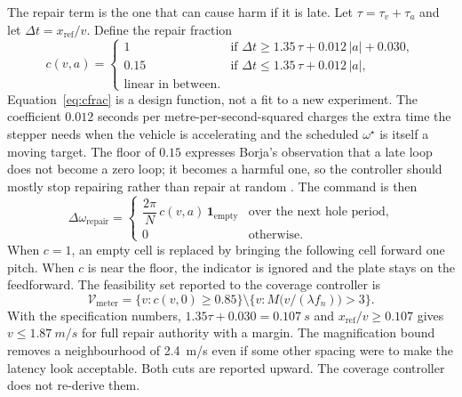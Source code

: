 The repair term is the one that can cause harm if it is late. Let \(\tau=\tau_v+\tau_a\) and let \(\Delta t=x_{\mathrm{ref}}/v\). Define the repair fraction
\begin{equation}
\label{eq:cfrac}
c(v,a) =
\begin{cases}
1 & \text{if }\Delta t \ge 1.35\,\tau + 0.012\,|a| + 0.030,\\
0.15 & \text{if }\Delta t \le 1.35\,\tau + 0.012\,|a|,\\
\text{linear in between.}
\end{cases}
\end{equation}
Equation~\eqref{eq:cfrac} is a design function, not a fit to a new experiment. The coefficient \(0.012\) seconds per metre-per-second-squared charges the extra time the stepper needs when the vehicle is accelerating and the scheduled \(\omega^{\star}\) is itself a moving target. The floor of \(0.15\) expresses Borja's observation that a late loop does not become a zero loop; it becomes a harmful one, so the controller should mostly stop repairing rather than repair at random \cite{borja2021}. The command is then
\begin{equation}
\label{eq:repair}
\Delta\omega_{\mathrm{repair}} =
\begin{cases}
\dfrac{2\pi}{N}\, c(v,a)\, \mathbf{1}_{\mathrm{empty}} & \text{over the next hole period,}\\
0 & \text{otherwise.}
\end{cases}
\end{equation}
When \(c=1\), an empty cell is replaced by bringing the following cell forward one pitch. When \(c\) is near the floor, the indicator is ignored and the plate stays on the feedforward. The feasibility set reported to the coverage controller is
\begin{equation}
\label{eq:vset}
\mathcal{V}_{\mathrm{meter}} = \bigl\{ v : c(v,0) \ge 0.85 \bigr\}
\setminus \bigl\{ v : M\bigl(v/(\lambda f_n)\bigr) > 3 \bigr\}.
\end{equation}
With the specification numbers, \(1.35\tau+0.030=\SI{0.107}{s}\) and \(x_{\mathrm{ref}}/v \ge 0.107\) gives \(v\le \SI{1.87}{m/s}\) for full repair authority with a margin. The magnification bound removes a neighbourhood of \SI{2.4}{m/s} even if some other spacing were to make the latency look acceptable. Both cuts are reported upward. The coverage controller does not re-derive them.

